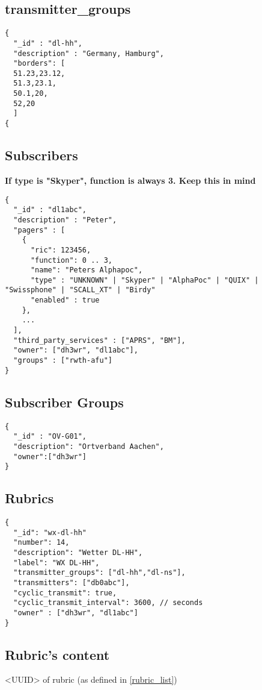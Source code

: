 \subsection{transmitter\_groups}
\label{protocoldef:couchdb:transmitter_groups}
\begin{lstlisting}
{
  "_id" : "dl-hh",
  "description" : "Germany, Hamburg",
  "borders": [
  51.23,23.12,
  51.3,23.1,
  50.1,20,
  52,20
  ]
{
\end{lstlisting}



\subsection{Subscribers}
\label{protocoldef:couchdb:subscribers}
\textbf{If type is "Skyper", function is always 3. Keep this in mind }
\begin{lstlisting}
{
  "_id" : "dl1abc",
  "description" : "Peter",
  "pagers" : [
    {
      "ric": 123456,
      "function": 0 .. 3,
      "name": "Peters Alphapoc",
      "type" : "UNKNOWN" | "Skyper" | "AlphaPoc" | "QUIX" | "Swissphone" | "SCALL_XT" | "Birdy"
      "enabled" : true
    },
    ...
  ],
  "third_party_services" : ["APRS", "BM"],
  "owner": ["dh3wr", "dl1abc"],
  "groups" : ["rwth-afu"]
}
\end{lstlisting}

\subsection{Subscriber Groups}

\begin{lstlisting}
{
  "_id" : "OV-G01",
  "description": "Ortverband Aachen",
  "owner":["dh3wr"]
}
\end{lstlisting}

\subsection{Rubrics}
\label{rubrics}

\begin{lstlisting}
{
  "_id": "wx-dl-hh"
  "number": 14,
  "description": "Wetter DL-HH",
  "label": "WX DL-HH",
  "transmitter_groups": ["dl-hh","dl-ns"],
  "transmitters": ["db0abc"],
  "cyclic_transmit": true,
  "cyclic_transmit_interval": 3600, // seconds
  "owner" : ["dh3wr", "dl1abc"]
}
\end{lstlisting}

\subsection{Rubric's content}
<UUID> of rubric (as defined in \ref{rubric_list})

